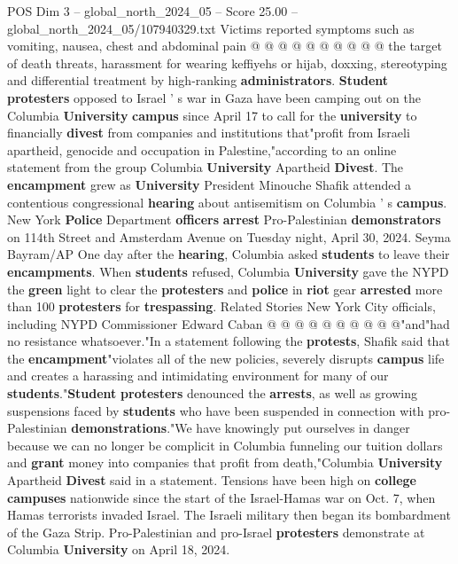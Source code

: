 \begin{textsample}{POS Dim 3 – global\_north\_2024\_05 – Score 25.00 – global\_north\_2024\_05/107940329.txt}
Victims reported symptoms such as vomiting, nausea, chest and abdominal pain @ @ @ @ @ @ @ @ @ @ the target of death threats, harassment for wearing keffiyehs or hijab, doxxing, stereotyping and differential treatment by high-ranking \textbf{administrators}. \textbf{Student} \textbf{protesters} opposed to Israel ' s war in Gaza have been camping out on the Columbia \textbf{University} \textbf{campus} since April 17 to call for the \textbf{university} to financially \textbf{divest} from companies and institutions that"profit from Israeli apartheid, genocide and occupation in Palestine,"according to an online statement from the group Columbia \textbf{University} Apartheid \textbf{Divest}.
The \textbf{encampment} grew as \textbf{University} President Minouche Shafik attended a contentious congressional \textbf{hearing} about antisemitism on Columbia ' s \textbf{campus}.
New York \textbf{Police} Department \textbf{officers} \textbf{arrest} Pro-Palestinian \textbf{demonstrators} on 114th Street and Amsterdam Avenue on Tuesday night, April 30, 2024.
Seyma Bayram/AP One day after the \textbf{hearing}, Columbia asked \textbf{students} to leave their \textbf{encampments}.
When \textbf{students} refused, Columbia \textbf{University} gave the NYPD the \textbf{green} light to clear the \textbf{protesters} and \textbf{police} in \textbf{riot} gear \textbf{arrested} more than 100 \textbf{protesters} for \textbf{trespassing}.
Related Stories New York City officials, including NYPD Commissioner Edward Caban @ @ @ @ @ @ @ @ @ @"and"had no resistance whatsoever."In a statement following the \textbf{protests}, Shafik said that the \textbf{encampment}"violates all of the new policies, severely disrupts \textbf{campus} life and creates a harassing and intimidating environment for many of our \textbf{students}."\textbf{Student} \textbf{protesters} denounced the \textbf{arrests}, as well as growing suspensions faced by \textbf{students} who have been suspended in connection with pro-Palestinian \textbf{demonstrations}."We have knowingly put ourselves in danger because we can no longer be complicit in Columbia funneling our tuition dollars and \textbf{grant} money into companies that profit from death,"Columbia \textbf{University} Apartheid \textbf{Divest} said in a statement.
Tensions have been high on \textbf{college} \textbf{campuses} nationwide since the start of the Israel-Hamas war on Oct. 7, when Hamas terrorists invaded Israel.
The Israeli military then began its bombardment of the Gaza Strip.
Pro-Palestinian and pro-Israel \textbf{protesters} demonstrate at Columbia \textbf{University} on April 18, 2024.

\end{textsample}
